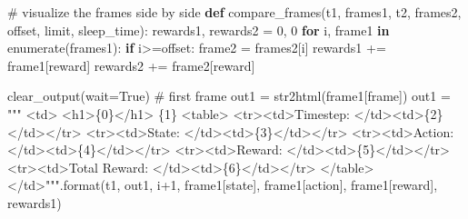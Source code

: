 \documentclass[
  letterpaper,
]{scrbook}
\newenvironment{Shaded}{\begin{snugshade}}{\end{snugshade}}
\newcommand{\BuiltInTok}[1]{\textcolor[rgb]{0.00,0.23,0.31}{#1}}
\newcommand{\CommentTok}[1]{\textcolor[rgb]{0.37,0.37,0.37}{#1}}
\newcommand{\ControlFlowTok}[1]{\textcolor[rgb]{0.00,0.23,0.31}{\textbf{#1}}}
\newcommand{\DecValTok}[1]{\textcolor[rgb]{0.68,0.00,0.00}{#1}}
\newcommand{\KeywordTok}[1]{\textcolor[rgb]{0.00,0.23,0.31}{\textbf{#1}}}
\newcommand{\NormalTok}[1]{\textcolor[rgb]{0.00,0.23,0.31}{#1}}
\newcommand{\OperatorTok}[1]{\textcolor[rgb]{0.37,0.37,0.37}{#1}}
\newcommand{\SpecialCharTok}[1]{\textcolor[rgb]{0.37,0.37,0.37}{#1}}
\newcommand{\StringTok}[1]{\textcolor[rgb]{0.13,0.47,0.30}{#1}}
\newcommand{\VariableTok}[1]{\textcolor[rgb]{0.07,0.07,0.07}{#1}}
\begin{document}
\begin{Shaded}
\begin{Highlighting}[]
\CommentTok{\# visualize the frames side by side}
\KeywordTok{def}\NormalTok{ compare\_frames(t1, frames1, t2, frames2, offset, limit, sleep\_time): }
\NormalTok{    rewards1, rewards2 }\OperatorTok{=} \DecValTok{0}\NormalTok{, }\DecValTok{0}
    \ControlFlowTok{for}\NormalTok{ i, frame1 }\KeywordTok{in} \BuiltInTok{enumerate}\NormalTok{(frames1): }
        \ControlFlowTok{if}\NormalTok{ i}\OperatorTok{\textgreater{}=}\NormalTok{offset: }
\NormalTok{            frame2 }\OperatorTok{=}\NormalTok{ frames2[i]}
\NormalTok{            rewards1 }\OperatorTok{+=}\NormalTok{ frame1[}\StringTok{\textquotesingle{}reward\textquotesingle{}}\NormalTok{]}
\NormalTok{            rewards2 }\OperatorTok{+=}\NormalTok{ frame2[}\StringTok{\textquotesingle{}reward\textquotesingle{}}\NormalTok{]}
            
\NormalTok{            clear\_output(wait}\OperatorTok{=}\VariableTok{True}\NormalTok{)}
            \CommentTok{\# first frame}
\NormalTok{            out1 }\OperatorTok{=}\NormalTok{ str2html(frame1[}\StringTok{\textquotesingle{}frame\textquotesingle{}}\NormalTok{])}
\NormalTok{            out1 }\OperatorTok{=} \StringTok{"""}
\StringTok{            \textless{}td\textgreater{}}
\StringTok{            \textless{}h1\textgreater{}}\SpecialCharTok{\{0\}}\StringTok{\textless{}/h1\textgreater{}}
\StringTok{            }\SpecialCharTok{\{1\}}
\StringTok{            \textless{}table\textgreater{}}
\StringTok{                \textless{}tr\textgreater{}\textless{}td\textgreater{}Timestep: \textless{}/td\textgreater{}\textless{}td\textgreater{}}\SpecialCharTok{\{2\}}\StringTok{\textless{}/td\textgreater{}\textless{}/tr\textgreater{}}
\StringTok{                \textless{}tr\textgreater{}\textless{}td\textgreater{}State: \textless{}/td\textgreater{}\textless{}td\textgreater{}}\SpecialCharTok{\{3\}}\StringTok{\textless{}/td\textgreater{}\textless{}/tr\textgreater{}}
\StringTok{                \textless{}tr\textgreater{}\textless{}td\textgreater{}Action: \textless{}/td\textgreater{}\textless{}td\textgreater{}}\SpecialCharTok{\{4\}}\StringTok{\textless{}/td\textgreater{}\textless{}/tr\textgreater{}}
\StringTok{                \textless{}tr\textgreater{}\textless{}td\textgreater{}Reward: \textless{}/td\textgreater{}\textless{}td\textgreater{}}\SpecialCharTok{\{5\}}\StringTok{\textless{}/td\textgreater{}\textless{}/tr\textgreater{}}
\StringTok{                \textless{}tr\textgreater{}\textless{}td\textgreater{}Total Reward: \textless{}/td\textgreater{}\textless{}td\textgreater{}}\SpecialCharTok{\{6\}}\StringTok{\textless{}/td\textgreater{}\textless{}/tr\textgreater{}}
\StringTok{            \textless{}/table\textgreater{}}
\StringTok{            \textless{}/td\textgreater{}"""}\NormalTok{.}\BuiltInTok{format}\NormalTok{(t1, out1, i}\OperatorTok{+}\DecValTok{1}\NormalTok{, frame1[}\StringTok{\textquotesingle{}state\textquotesingle{}}\NormalTok{], frame1[}\StringTok{\textquotesingle{}action\textquotesingle{}}\NormalTok{], frame1[}\StringTok{\textquotesingle{}reward\textquotesingle{}}\NormalTok{], rewards1)}


\end{Highlighting}
\end{Shaded}
\end{document}
